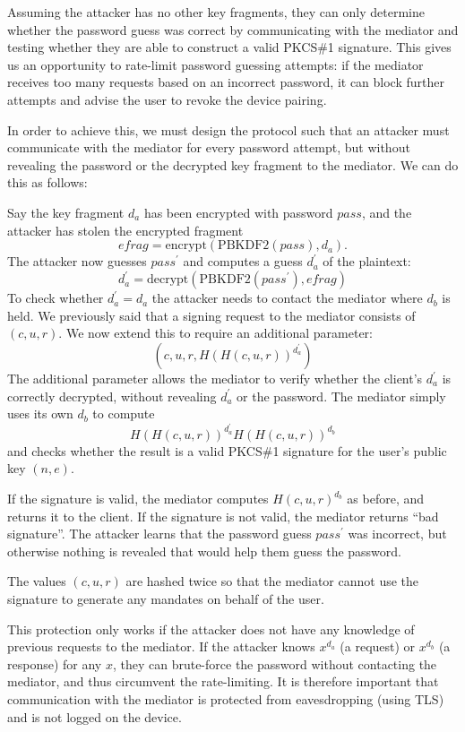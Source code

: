 Assuming the attacker has no other key fragments, they can only determine whether the password guess
was correct by communicating with the mediator and testing whether they are able to construct a
valid PKCS\#1 signature. This gives us an opportunity to rate-limit password guessing attempts: if
the mediator receives too many requests based on an incorrect password, it can block further
attempts and advise the user to revoke the device pairing.

In order to achieve this, we must design the protocol such that an attacker must communicate with
the mediator for every password attempt, but without revealing the password or the decrypted key
fragment to the mediator. We can do this as follows:

Say the key fragment $d_a$ has been encrypted with password $\mathit{pass}$, and the attacker has
stolen the encrypted fragment
$$\mathit{efrag} = \mathrm{encrypt}(\mathrm{PBKDF2}(\mathit{pass}), d_a).$$
The attacker now guesses $\mathit{pass}^\prime$ and computes a guess $d_a^\prime$ of the plaintext:
$$d_a^\prime = \mathrm{decrypt}(\mathrm{PBKDF2}(\mathit{pass}^\prime), \mathit{efrag})$$
To check whether $d_a^\prime = d_a$ the attacker needs to contact the mediator where $d_b$ is held.
We previously said that a signing request to the mediator consists of $(c, u, r)$. We now extend
this to require an additional parameter:
$$\left(c, u, r, H(H(c, u, r))^{d_a^\prime}\right)$$
The additional parameter allows the mediator to verify whether the client's $d_a^\prime$ is
correctly decrypted, without revealing $d_a^\prime$ or the password. The mediator simply uses its
own $d_b$ to compute $$H(H(c, u, r))^{d_a^\prime}H(H(c, u, r))^{d_b}$$ and checks whether the result
is a valid PKCS\#1 signature for the user's public key $(n, e)$.

If the signature is valid, the mediator computes $H(c, u, r)^{d_b}$ as before, and returns it to the
client. If the signature is not valid, the mediator returns ``bad signature''. The attacker learns
that the password guess $\mathit{pass}^\prime$ was incorrect, but otherwise nothing is revealed that
would help them guess the password.

The values $(c, u, r)$ are hashed twice so that the mediator cannot use the signature to generate
any mandates on behalf of the user.

This protection only works if the attacker does not have any knowledge of previous requests to the
mediator. If the attacker knows $x^{d_a}$ (a request) or $x^{d_b}$ (a response) for any $x$, they
can brute-force the password without contacting the mediator, and thus circumvent the rate-limiting.
It is therefore important that communication with the mediator is protected from eavesdropping
(using TLS) and is not logged on the device.


